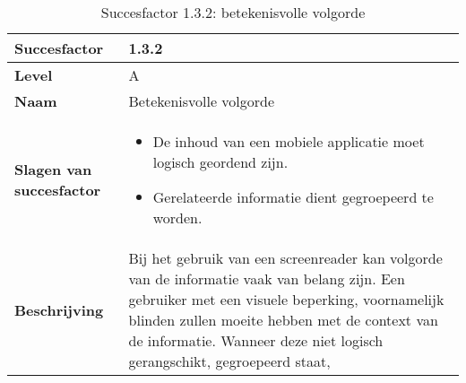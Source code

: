 \begin{table}[H]
    \centering
    \caption{Succesfactor 1.3.2: betekenisvolle volgorde}
    \hspace*{-1cm}\begin{tabular}{|l|p{12cm}|} 
        \hline
        \textbf{Succesfactor}                & 1.3.2                                                                                                                                                                                                                                                                                                            \\ 
        \hline
        \textbf{Level}                       & A                                                                                                                                                                                                                                                                                                                                                                             \\ 
        \hline
        \textbf{Naam}                        & Betekenisvolle volgorde~                                                                                                                                                                                                                                                                                                                                                            \\ 
        \hline
        \textbf{Slagen van succesfactor}     & \begin{itemize}
            \item De inhoud van een mobiele applicatie moet logisch geordend zijn.
            \item Gerelateerde informatie dient gegroepeerd te worden.
        \end{itemize}                                                                                                                                                                                                                         
        \\ 
        \hline
        \textbf{Beschrijving}                & Bij het gebruik van een screenreader kan volgorde van de informatie vaak van belang zijn. Een gebruiker met een visuele beperking, voornamelijk blinden zullen moeite hebben met de context van de informatie. Wanneer deze niet logisch gerangschikt, gegroepeerd staat,

\end{tabular}
\end{table}
